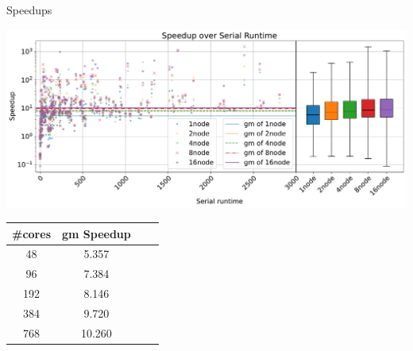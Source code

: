 \documentclass[]{sdqbeamer}
\begin{document}
\begin{frame}{Speedups}
    \begin{minipage}{.45\textwidth}
        \noindent
        \center
        \includegraphics[scale=.6]{plots/speedups_gim.pdf}
    \end{minipage}
    \hfill
    \begin{minipage}{.45\textwidth}
        \noindent
        \center
        \begin{table}[!h]
            \begin{tabular}{ cccc }
                \toprule
                \#cores & gm Speedup\\
                \midrule
                48 & 5.357\\
                96 & 7.384\\
                192 & 8.146\\
                384 & 9.720\\
                768 & 10.260\\
              \bottomrule
            \end{tabular}
    \end{table}
    \end{minipage}
\end{frame}
\end{document}

